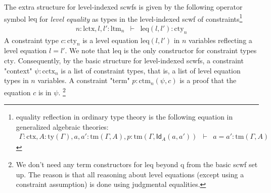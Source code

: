 \documentclass[11pt,a4paper]{article}
\theoremstyle{definition}
\newcommand{\Id}{\mathsf{Id}}
\def\lctx{\mathrm{lctx}}
\def\ltm{\mathrm{ltm}}
\def\leq{\mathrm{leq}}
\def\cctx{\mathrm{cctx}}
\def\cty{\mathrm{cty}}
\def\ctm{\mathrm{ctm}}
\newcommand{\ctx}{\mathrm{ctx}}
\newcommand{\ty}{\mathrm{ty}}
\newcommand{\tm}{\mathrm{tm}}
\def\q{\mathrm{q}}
\begin{document}
The extra structure for level-indexed scwfs is given by the following operator symbol $\leq$ for {\em level equality} as types in the level-indexed scwf of constraints\footnote{equality reflection in ordinary type theory is the following equation in generalized algebraic theories:
\begin{eqnarray*}
\Gamma : \ctx, A : \ty(\Gamma), a, a' : \tm(\Gamma, A),p :  \tm(\Gamma,\Id_A(a,a'))&\vdash& a = a' : \tm(\Gamma,A)
\end{eqnarray*}
}
\begin{eqnarray*}
n : \lctx, l, l' : \ltm_n &\vdash& \leq(l,l') : \cty_n
\end{eqnarray*}
A constraint type $c : \cty_n$ is a level equation 
$\leq(l,l')$ in $n$ variables reflecting a level equation $l = l'$.
We note that $\leq$ is the only constructor for constraint types $\cty$. 
Consequently, by the basic structure for level-indexed scwfs,
a constraint "context" $\psi : \cctx_n$ is a list of constraint types, 
that is, a list of level equation types in $n$ variables. 
A constraint "term" $p : \ctm_n(\psi,c)$ is a proof that the equation $c$ is
in $\psi$.
\footnote{We don't need 
any term constructors for $\leq$ beyond $\q$ from the basic
scwf set up. The reason is that all reasoning about level equations 
(except using a constraint assumption) is done using judgmental equalities.} 
\end{document}
